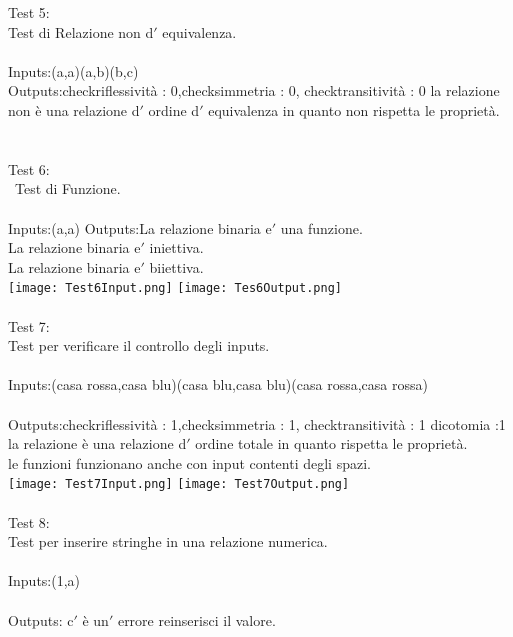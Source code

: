 \documentclass[11pt, a4paper, titlepage, block]{article}
\begin{document}
	Test 5:\\
	Test di Relazione non d$'$ equivalenza.\\
	\\
	Inputs:(a,a)(a,b)(b,c)\\
	Outputs:checkriflessivit\`a : 0,checksimmetria : 0, checktransitivit\`a : 0
	la relazione non \`e una relazione d$'$ ordine d$'$ equivalenza in quanto non rispetta le propriet\`a.\\
	\\
	\\
	Test 6:\\\
	Test di Funzione.\\
	\\
	Inputs:(a,a)
	Outputs:La relazione binaria e$'$  una funzione.\\
	La relazione binaria e$'$  iniettiva.\\
	La relazione binaria e$'$  biiettiva.\\
	\texttt{[image: Test6Input.png]}
	\texttt{[image: Tes6Output.png]}
	\\
	\\
	Test 7:\\
	Test per verificare il controllo degli inputs.\\
	\\
	Inputs:(casa rossa,casa blu)(casa blu,casa blu)(casa rossa,casa rossa)\\
	\\
	Outputs:check\textunderscore riflessivit\`a : 1,check\textunderscore simmetria : 1, check\textunderscore transitivit\`a : 1 dicotomia :1
	la relazione \`e una relazione d$'$ ordine totale in quanto rispetta le propriet\`a.\\
	le funzioni funzionano anche con input contenti degli spazi.\\
	\texttt{[image: Test7Input.png]}
	\texttt{[image: Test7Output.png]}
	\\
	\\
	Test 8:\\
	Test per inserire stringhe in una relazione numerica.\\
	\\
	Inputs:(1,a)\\
	\\
	Outputs: c$'$ \`e un$'$ errore reinserisci il valore.\\
	\\
\end{document}
